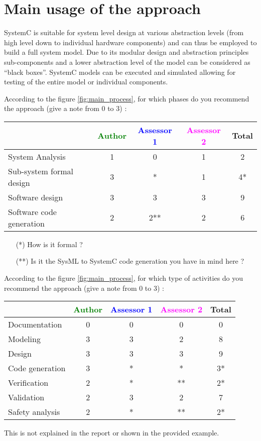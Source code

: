 \section{Main usage of the approach}
\label{main_usage}

SystemC is suitable for system level design at various abstraction levels (from high level down to individual hardware components) and can thus be employed to build a full system model. Due to its modular design and abstraction principles sub-components and a lower abstraction level of the model can be considered as ``black boxes''. SystemC models can be executed and simulated allowing for testing of the entire model or individual components.

According to the figure \ref{fig:main_process}, for which phases do you recommend the approach (give a note from 0 to 3) :

\begin{tabular}{|l | c | c | c | c|}
\hline
& \textcolor{green}{Author} & \textcolor{blue}{Assessor 1} & \textcolor{magenta}{Assessor 2} & Total \\
\hline
System Analysis &1 & 0 & 1 & 2 \\
\hline
Sub-system formal design & 3 & *  &  1 & 4* \\
\hline
Software design &3 &3 & 3 & 9 \\
\hline
Software code generation &2 & 2** & 2 & 6 \\
\hline
\end{tabular}
\begin{assessor1}
\begin{itemize}
\item[(*)] How is it formal ?
\item[(**)] Is it the SysML to  SystemC code generation  you have in
  mind here ?
\end{itemize}
\end{assessor1}

According to the figure \ref{fig:main_process}, for which type of activities do you recommend the approach (give a note from 0 to 3) :

\begin{tabular}{|l | c | c | c | c|}
\hline
& \textcolor{green}{Author} & \textcolor{blue}{Assessor 1} & \textcolor{magenta}{Assessor 2} & Total \\
\hline
Documentation &0 & 0 & 0 & 0 \\
\hline
Modeling &3 & 3 & 2 & 8 \\
\hline
Design &3 &3 & 3 & 9 \\
\hline
Code generation &3 & *  & * & 3* \\
\hline
Verification &2 &* & ** & 2* \\
\hline
Validation &2 &3 & 2 & 7 \\
\hline
Safety analysis &2 &* & ** & 2* \\
\hline
\end{tabular}
\begin{assessor1}
This is not explained in the report or shown in  the provided example.
\end{assessor1}

